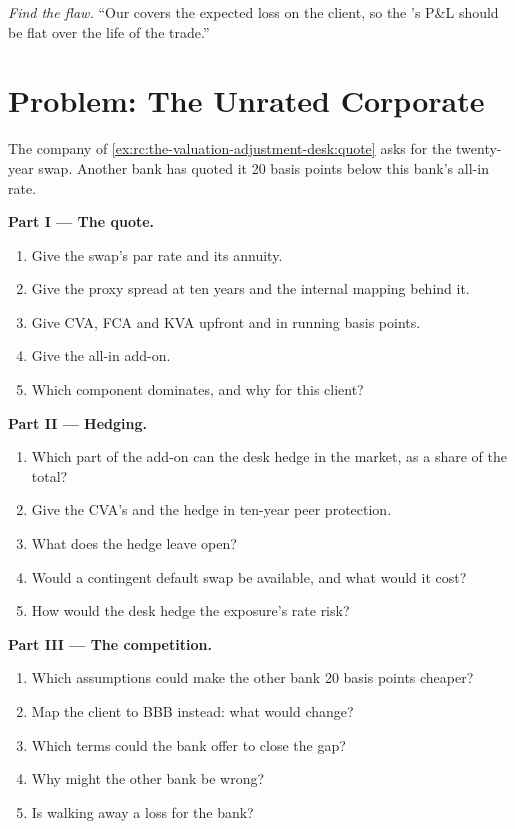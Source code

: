 \begin{exercise}[$\star\star\star$]\label{exo:rc:the-valuation-adjustment-desk:8}
\emph{Find the flaw.} ``Our  covers the expected loss on the client, so the 's P\&L should be flat over the life of the trade.''
\end{exercise}

\section{Problem: The Unrated Corporate}

\begin{problem}\label{pb:rc:the-valuation-adjustment-desk:1}
The company of \cref{ex:rc:the-valuation-adjustment-desk:quote} asks for the twenty-year swap.
Another bank has quoted it 20 basis points below this bank's all-in rate.

\medskip\noindent\textbf{Part I --- The quote.}
\begin{enumerate}
\item Give the swap's par rate and its annuity.
\item Give the proxy spread at ten years and the internal mapping behind it.
\item Give CVA, FCA and KVA upfront and in running basis points.
\item Give the all-in add-on.
\item Which component dominates, and why for this client?
\end{enumerate}

\medskip\noindent\textbf{Part II --- Hedging.}
\begin{enumerate}[resume]
\item Which part of the add-on can the desk hedge in the market, as a share of the total?
\item Give the CVA's  and the hedge in ten-year peer protection.
\item What does the hedge leave open?
\item Would a contingent default swap be available, and what would it cost?
\item How would the desk hedge the exposure's rate risk?
\end{enumerate}

\medskip\noindent\textbf{Part III --- The competition.}
\begin{enumerate}[resume]
\item Which assumptions could make the other bank 20 basis points cheaper?
\item Map the client to BBB instead: what would change?
\item Which terms could the bank offer to close the gap?
\item Why might the other bank be wrong?
\item Is walking away a loss for the bank?
\end{enumerate}


\end{problem}

